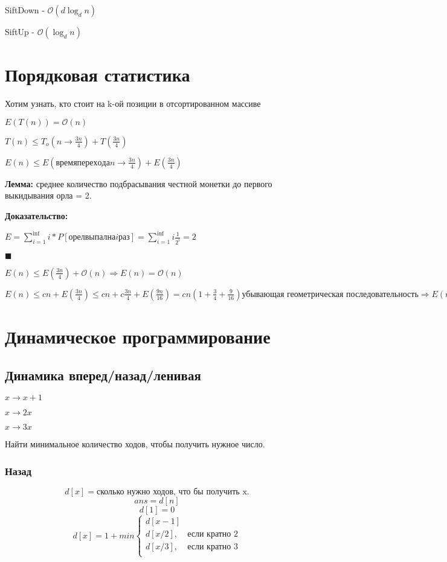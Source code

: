 \documentclass[12pt]{article}
\def\O{\mathcal{O}}
\begin{document}
SiftDown - $\O(d\log_d n)$

SiftUp - $\O(\log_d n)$


\section{Порядковая статистика}

Хотим узнать, кто стоит на k-ой позиции в отсортированном массиве

$E(T(n)) = \O(n)$

$T(n) \le T_o(n \to \frac{3n}{4}) + T(\frac{3n}{4})$

$E(n) \le E(время перехода n \to \frac{3n}{4}) + E(\frac{3n}{4})$

{\bf Лемма:} среднее количество подбрасывания честной монетки до первого выкидывания орла = 2.

{\bf Доказательство:}

$E = \sum_{i = 1}^{\inf} i*P[орел выпал на i раз] = \sum_{i = 1}^{\inf} i \frac{1}{2^i} = 2$ 

$\blacksquare$

$E(n) \le E(\frac{3n}{4}) + \O(n) \Rightarrow E(n) = \O(n)$

$E(n) \le cn + E(\frac{3n}{4}) \le cn + c\frac{3n}{4} + E(\frac{9n}{16}) = cn(1 + \frac{3}{4} + \frac{9}{16})\text{убывающая геометрическая последовательность} \Rightarrow E(n) = \O(n)$

\section{Динамическое программирование}
\subsection{Динамика вперед/назад/ленивая}
$x \to x + 1$

$x \to 2x$

$x \to 3x$

Найти минимальное количество ходов, чтобы получить нужное число.

\subsubsection{Назад}

$$
d[x] = \text{сколько нужно ходов, что бы получить x.}
$$
$$
ans = d[n]
$$
$$
d[1] = 0
$$
$$
d[x] = 1 + min\begin{cases}
d[x - 1]\\
d[x/2], & \text{если кратно 2}\\
d[x/3], & \text{если кратно 3}\\
\end{cases}
$$
\end{document}
